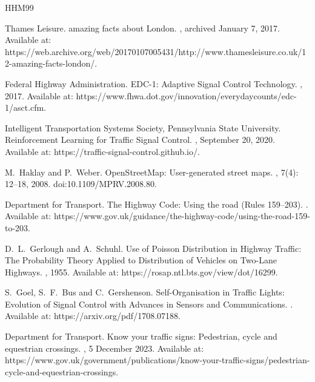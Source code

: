 \documentclass[a4paper]{report}
\begin{document}
\appendix

\begin{thebibliography}{HHM99}

Thames Leisure.
 amazing facts about London.
, archived January 7, 2017.
\newblock Available at:
  https://web.archive.org/web/20170107005431/http://www.thamesleisure.co.uk/12-amazing-facts-london/.

Federal Highway Administration.
\newblock EDC-1: Adaptive Signal Control Technology.
, 2017.
\newblock Available at:
  https://www.fhwa.dot.gov/innovation/everydaycounts/edc-1/asct.cfm.

Intelligent Transportation Systems Society, Pennsylvania State University.
\newblock Reinforcement Learning for Traffic Signal Control.
, September 20, 2020.
\newblock Available at:
  https://traffic-signal-control.github.io/.

M.~Haklay and P.~Weber.
\newblock OpenStreetMap: User-generated street maps.
, 7(4): 12--18, 2008.
\newblock doi:10.1109/MPRV.2008.80.

Department for Transport.
\newblock The Highway Code: Using the road (Rules 159--203).
.
\newblock Available at:
  https://www.gov.uk/guidance/the-highway-code/using-the-road-159-to-203.

D.~L.~Gerlough and A.~Schuhl.
\newblock Use of Poisson Distribution in Highway Traffic: The Probability Theory Applied to Distribution of Vehicles on Two-Lane Highways.
, 1955.
\newblock Available at:
  https://rosap.ntl.bts.gov/view/dot/16299.

S.~Goel, S.~F.~Bus and C.~Gershenson.
\newblock Self-Organisation in Traffic Lights: Evolution of Signal Control with Advances in Sensors and Communications.
.
\newblock Available at:
  https://arxiv.org/pdf/1708.07188.

Department for Transport.
\newblock Know your traffic signs: Pedestrian, cycle and equestrian crossings.
, 5 December 2023.
\newblock Available at:
  https://www.gov.uk/government/publications/know-your-traffic-signs/pedestrian-cycle-and-equestrian-crossings.


\end{thebibliography}
\end{document}
